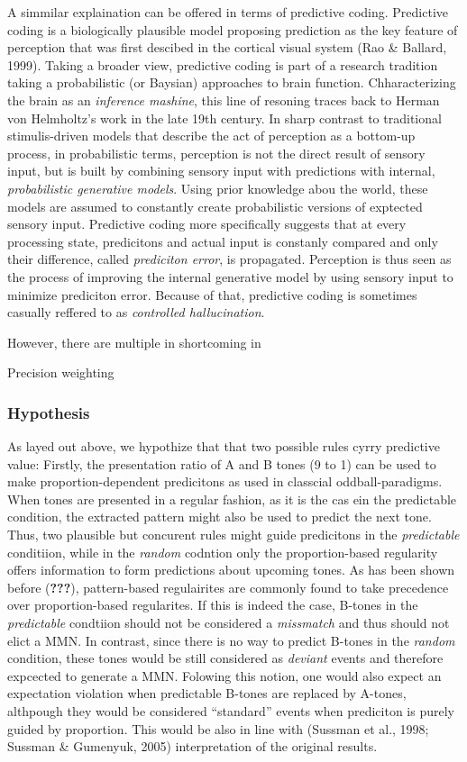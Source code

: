 \documentclass[stu,a4paper,11pt,floatsintext]{apa7}
\begin{document}
A simmilar explaination can be offered in terms of predictive coding.
Predictive coding is a biologically plausible model proposing prediction
as the key feature of perception that was first descibed in the cortical
visual system (Rao \& Ballard, 1999). Taking a broader view, predictive
coding is part of a research tradition taking a probabilistic (or
Baysian) approaches to brain function. Chharacterizing the brain as an
\emph{inference mashine}, this line of resoning traces back to Herman
von Helmholtz's work in the late 19th century. In sharp contrast to
traditional stimulis-driven models that describe the act of perception
as a bottom-up process, in probabilistic terms, perception is not the
direct result of sensory input, but is built by combining sensory input
with predictions with internal, \emph{probabilistic generative models}.
Using prior knowledge abou the world, these models are assumed to
constantly create probabilistic versions of exptected sensory input.
Predictive coding more specifically suggests that at every processing
state, predicitons and actual input is constanly compared and only their
difference, called \emph{prediciton error}, is propagated. Perception is
thus seen as the process of improving the internal generative model by
using sensory input to minimize prediciton error. Because of that,
predictive coding is sometimes casually reffered to as \emph{controlled
hallucination}.

However, there are multiple in shortcoming in

Precision weighting

\hypertarget{hypothesis}{%
\subsubsection{Hypothesis}\label{hypothesis}}

As layed out above, we hypothize that that two possible rules cyrry
predictive value: Firstly, the presentation ratio of A and B tones (9 to
1) can be used to make proportion-dependent predicitons as used in
classcial oddball-paradigms. When tones are presented in a regular
fashion, as it is the cas ein the predictable condition, the extracted
pattern might also be used to predict the next tone. Thus, two plausible
but concurent rules might guide predicitons in the \emph{predictable}
conditiion, while in the \emph{random} codntion only the
proportion-based regularity offers information to form predictions about
upcoming tones. As has been shown before ({\textbf{???}}), pattern-based
regulairites are commonly found to take precedence over proportion-based
regularites. If this is indeed the case, B-tones in the
\emph{predictable} condtiion should not be considered a \emph{missmatch}
and thus should not elict a MMN. In contrast, since there is no way to
predict B-tones in the \emph{random} condition, these tones would be
still considered as \emph{deviant} events and therefore expcected to
generate a MMN. Folowing this notion, one would also expect an
expectation violation when predictable B-tones are replaced by A-tones,
althpough they would be considered \enquote{standard} events when
prediciton is purely guided by proportion. This would be also in line
with (Sussman et al., 1998; Sussman \& Gumenyuk, 2005) interpretation of
the original results.
\end{document}
